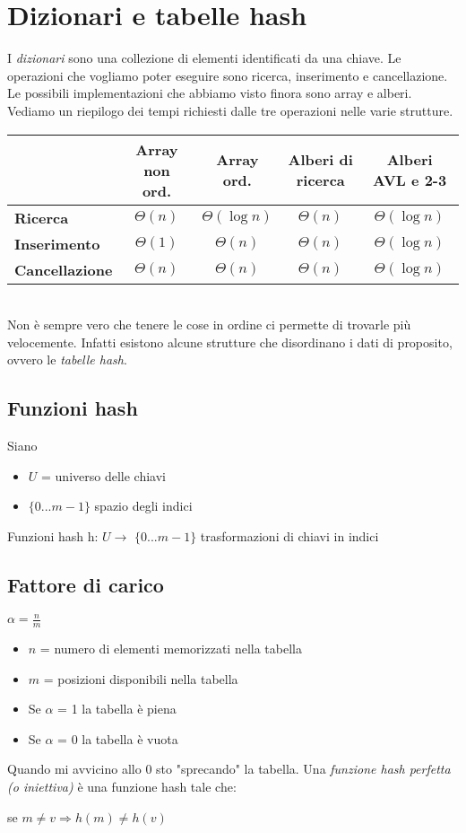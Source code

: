 \section{Dizionari e tabelle hash}
I \emph{dizionari} sono una collezione di elementi identificati da una chiave.
Le operazioni che vogliamo poter eseguire sono ricerca, inserimento e cancellazione.
Le possibili implementazioni che abbiamo visto finora sono array e alberi.
Vediamo un riepilogo dei tempi richiesti dalle tre operazioni nelle varie strutture.\\
\begin{tabular}{|l|c|c|c|c|}
    \hline
    \space & \textbf{Array non ord.} & \textbf{Array ord.} & \textbf{Alberi di ricerca} & \textbf{Alberi AVL e 2-3}\\
    \hline
    \textbf{Ricerca} & $\Theta(n)$ & $\Theta(\log n)$ & $\Theta(n)$ & $\Theta(\log n)$\\
    \hline
    \textbf{Inserimento} & $\Theta(1)$ & $\Theta(n)$ & $\Theta(n)$ & $\Theta(\log n)$\\
    \hline
    \textbf{Cancellazione} & $\Theta(n)$ & $\Theta(n)$ & $\Theta(n)$ & $\Theta(\log n)$\\
    \hline
\end{tabular}\\
Non è sempre vero che tenere le cose in ordine ci permette di trovarle più velocemente.
Infatti esistono alcune strutture che disordinano i dati di proposito, ovvero le 
\emph{tabelle hash}.
\subsection{Funzioni hash}
Siano
\begin{itemize}
    \item $U$ = universo delle chiavi
    \item $\lbrace 0 ... m-1\rbrace$ spazio degli indici
\end{itemize}

Funzioni hash h: $U \rightarrow$ $\lbrace 0 ... m-1\rbrace$ trasformazioni di 
chiavi in indici 
\subsection{Fattore di carico}
$\alpha = \frac{n}{m}$\\
\begin{itemize}
    \item $n$ = numero di elementi memorizzati nella tabella
    \item $m$ = posizioni disponibili nella tabella
    \item Se $\alpha$ = 1 la tabella è piena
    \item Se $\alpha$ = 0 la tabella è vuota
\end{itemize}
Quando mi avvicino allo 0 sto "sprecando" la tabella.
Una \emph{funzione hash perfetta (o iniettiva)} è una funzione hash tale che:
\begin{center}
    se $m \neq v \Rightarrow h(m) \neq h(v)$
\end{center}


